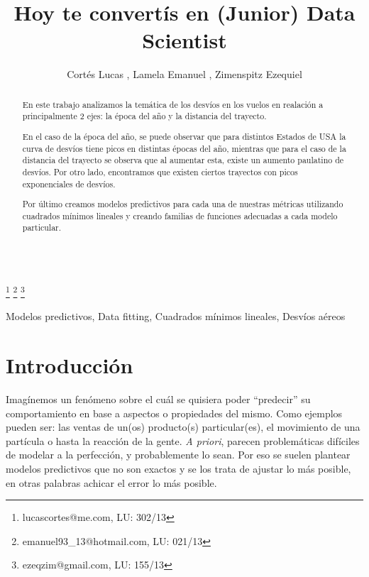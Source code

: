 \documentclass{endm}
\begin{document}
\begin{verbatim}\end{verbatim}\vspace{2.5cm}

\begin{frontmatter}

\title{Hoy te convert\'is en (Junior) Data Scientist}

\author{Cort\'es Lucas , Lamela Emanuel , Zimenspitz Ezequiel }
\address{Universidad de Buenos Aires\\ Buenos Aires, Argentina}

\thanks[lucasemail]{lucascortes@me.com, LU: 302/13}
\thanks[emanuelemail]{emanuel93\_13@hotmail.com, LU: 021/13}
\thanks[ezequielemail]{ezeqzim@gmail.com, LU: 155/13}

\begin{abstract}

En este trabajo analizamos la tem\'atica de los desv\'ios en los vuelos en realaci\'on a principalmente 2 ejes: la \'epoca del a\~no y la distancia del trayecto. 

En el caso de la \'epoca del a\~no, se puede observar que para distintos Estados de USA la curva de desv\'ios tiene picos en distintas \'epocas del a\~no, mientras que para el caso de la distancia del trayecto se observa que al aumentar esta, existe un aumento paulatino de desv\'ios. Por otro lado, encontramos que existen ciertos trayectos con picos exponenciales de desv\'ios.

Por \'ultimo creamos modelos predictivos para cada una de nuestras m\'etricas utilizando cuadrados m\'inimos lineales y creando familias de funciones adecuadas a cada modelo particular.

\end{abstract}

\begin{keyword}
Modelos predictivos, Data fitting, Cuadrados m\'inimos lineales, Desv\'ios a\'ereos
\end{keyword}

\end{frontmatter}

\section{Introducci\'on}\label{intro}

Imag\'inemos un fen\'omeno sobre el cu\'al se quisiera poder ``predecir'' su comportamiento en base a aspectos o propiedades del mismo. Como ejemplos pueden ser: las ventas de un(os) producto(s) particular(es), el movimiento de una part\'icula o hasta la reacci\'on de la gente. \textit{A priori}, parecen problem\'aticas dif\'iciles de modelar a la perfecci\'on, y probablemente lo sean. Por eso se suelen plantear modelos predictivos que no son exactos y se los trata de ajustar lo m\'as posible, en otras palabras achicar el error lo m\'as posible.
\end{document}
